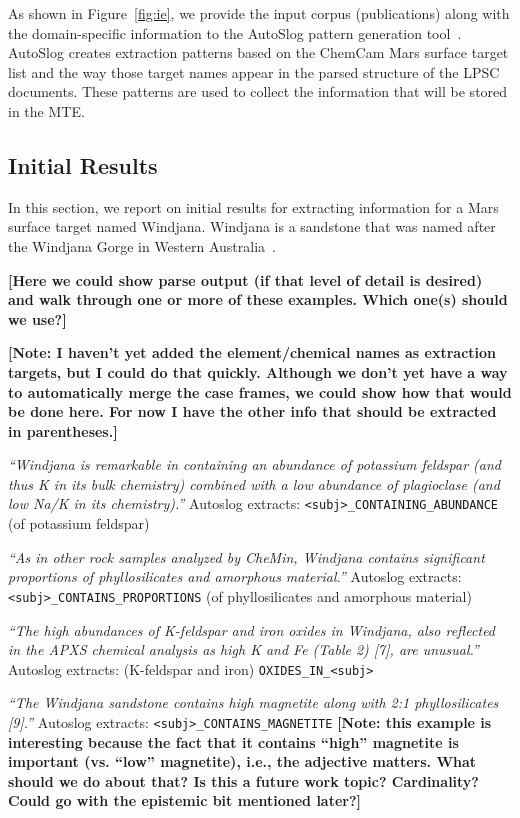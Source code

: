 \documentclass[letterpaper]{article}
\begin{document}
As shown in Figure~\ref{fig:ie}, we provide the input corpus
(publications) along with the domain-specific information to 
the AutoSlog pattern generation 
tool~\cite{riloff:autoslog93,riloff:autoslog96}.  AutoSlog  
creates extraction patterns based on the ChemCam Mars surface target
list and the way those target names appear in the parsed structure of
the LPSC documents.  These patterns are used to collect the
information that will be stored in the MTE.

\subsection{Initial Results}

In this section, we report on initial results for extracting
information for a Mars surface target named Windjana.  Windjana is a
sandstone that was named after the Windjana Gorge in Western
Australia~\cite{anderson:pads15}. 

{\bf [Here we could show parse output (if that level of detail is
desired) and walk through one or more of 
these examples.  Which one(s) should we use?]}

{\bf [Note: I haven't yet added the element/chemical names as
extraction targets, but I could do that quickly.  Although we don't
yet have a way to automatically merge the case frames, we could show
how that would be done here.  For now I have the other info that
should be extracted in parentheses.]} 

{\em ``Windjana is remarkable in containing an abundance of potassium
feldspar (and thus K in its bulk chemistry) combined with a low
abundance of plagioclase (and low Na/K in its chemistry).''}
Autoslog extracts:
{\tt <subj>\_CONTAINING\_ABUNDANCE} 
(of potassium feldspar)

{\em ``As in other rock samples analyzed by CheMin, Windjana contains
significant proportions of phyllosilicates and amorphous material.''}
Autoslog extracts:
{\tt <subj>\_CONTAINS\_PROPORTIONS}
(of phyllosilicates and amorphous material)

{\em ``The high abundances of K-feldspar and iron oxides in Windjana, also
reflected in the APXS chemical analysis as high K and Fe (Table 2)
[7], are unusual.''}
Autoslog extracts:
(K-feldspar and iron) 
{\tt OXIDES\_IN\_<subj>}

{\em ``The Windjana sandstone contains high magnetite along with 2:1
phyllosilicates [9].''}
Autoslog extracts:
{\tt <subj>\_CONTAINS\_MAGNETITE} 
{\bf [Note: this example is interesting because the fact that it
contains ``high'' magnetite is important (vs. ``low'' magnetite),
i.e., the adjective matters.  What should we do about that?  Is this a
future work topic?  Cardinality?  Could go with the epistemic bit
mentioned later?]}
\end{document}
